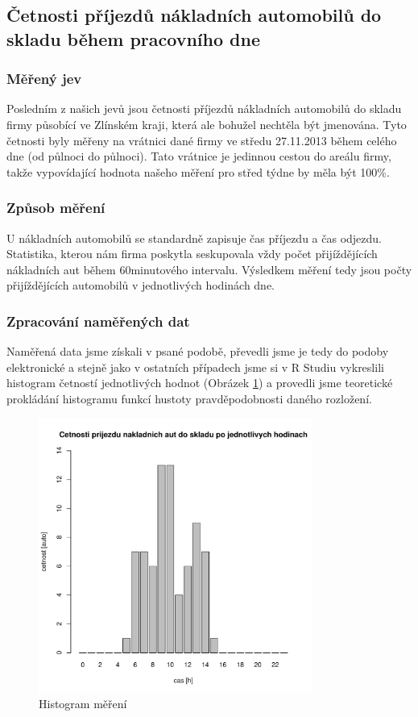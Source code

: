 \documentclass[12pt,a4paper]{article}
\begin{document}
	\subsection{Četnosti příjezdů nákladních automobilů do skladu během pracovního dne}
		\subsubsection{Měřený jev}
		Posledním z našich jevů jsou četnosti příjezdů nákladních automobilů do skladu firmy působící 
		ve Zlínském kraji, která ale bohužel nechtěla být jmenována. Tyto četnosti byly měřeny na vrátnici 
		dané firmy ve středu 27.11.2013 během celého dne (od půlnoci do půlnoci). Tato vrátnice je jedinnou
		cestou do areálu firmy, takže vypovídající hodnota našeho měření pro střed týdne by měla být 100\%. 

		\subsubsection{Způsob měření}
		U nákladních automobilů se standardně zapisuje čas příjezdu a čas odjezdu. Statistika, kterou nám firma
		poskytla seskupovala vždy počet přijíždějících nákladních aut během 60minutového intervalu. Výsledkem měření
		tedy jsou počty přijíždějících automobilů v jednotlivých hodinách dne.

		\subsubsection{Zpracování naměřených dat}
		Naměřená data jsme získali v psané podobě, převedli jsme je tedy do podoby elektronické a stejně jako v ostatních
		případech jsme si v R Studiu vykreslili histogram četností jednotlivých hodnot (Obrázek \ref{sklad}) a provedli jsme 
		teoretické prokládání histogramu funkcí hustoty pravděpodobnosti daného rozložení.

		\begin{figure}[ht!]
		\centering
		\includegraphics[width=90mm]{../measuring/skladBarPlot.pdf}
		\caption{Histogram měření}
		\label{sklad}
		\end{figure}
\end{document}
